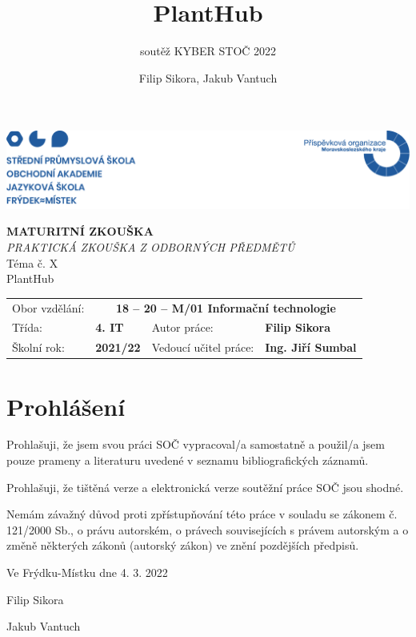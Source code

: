 \documentclass[12pt,a4paper]{article}
\title{PlantHub}
\subtitle{soutěž KYBER STOČ 2022 }
\author{Filip Sikora, Jakub Vantuch}
\date{}
\newcommand*\wildcard[2][5cm]{\vspace*{2cm}\parbox{#1}{\centering\hrulefill\par#2\par}}
\begin{document}
\begin{titlepage}
	\noindent\includegraphics[width=\linewidth]{header.png}
	\vspace{1cm} \\
	\begin{center}
		\Huge\textbf{MATURITNÍ ZKOUŠKA}
		\vspace*{1.2cm} \\
		\large \emph{PRAKTICKÁ ZKOUŠKA Z ODBORNÝCH PŘEDMĚTŮ}
		\vspace*{5cm} \\
		\Large Téma č. X \\
		\vspace*{1cm} 
		\Large PlantHub \\
		\vfill
		\normalsize
	\end{center}
	\begin{tabularx}{\textwidth}{l@{\hskip 1.8cm}XXl}
		Obor vzdělání: & \multicolumn{3}{c}{\textbf{18 – 20 – M/01 Informační technologie}} \\[10pt]
		Třída: & \textbf{4. IT} & Autor práce: & \textbf{Filip Sikora} \\[10pt]
		Školní rok: & \textbf{2021/22} & Vedoucí učitel práce: & \textbf{Ing. Jiří Sumbal}
	\end{tabularx}
\end{titlepage}

\section*{Prohlášení}

Prohlašuji, že jsem svou práci SOČ vypracoval/a samostatně a použil/a jsem
pouze prameny a literaturu uvedené v seznamu bibliografických záznamů.

Prohlašuji, že tištěná verze a elektronická verze soutěžní práce SOČ jsou
shodné.

Nemám závažný důvod proti zpřístupňování této práce v souladu se zákonem č.
121/2000 Sb., o právu autorském, o právech souvisejících s právem autorským a o
změně některých zákonů (autorský zákon) ve znění pozdějších předpisů.

Ve Frýdku-Místku dne 4. 3. 2022

\begingroup
  \centering
  \wildcard{Filip Sikora}
  \hspace{1cm}
  \wildcard{Jakub Vantuch}
  \par
\endgroup
\end{document}
